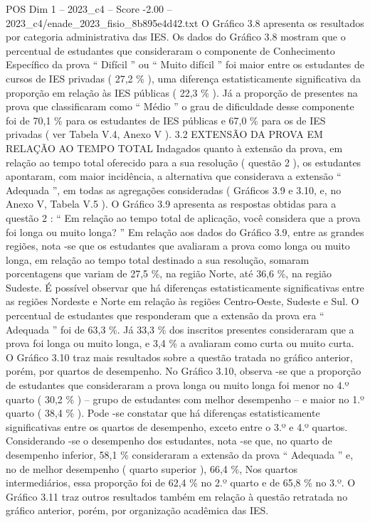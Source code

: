 \begin{textsample}{POS Dim 1 – 2023\_c4 – Score -2.00 – 2023\_c4/enade\_2023\_fisio\_8b895e4d42.txt}
O Gráfico 3.8 apresenta os resultados por categoria administrativa das IES.
Os dados do Gráfico 3.8 mostram que o percentual de estudantes que consideraram o componente de Conhecimento Específico da prova “ Difícil ” ou “ Muito difícil ” foi maior entre os estudantes de cursos de IES privadas ( 27,2 \% ), uma diferença estatisticamente significativa da proporção em relação às IES públicas ( 22,3 \% ).
Já a proporção de presentes na prova que classificaram como “ Médio ” o grau de dificuldade desse componente foi de 70,1 \% para os estudantes de IES públicas e 67,0 \% para os de IES privadas ( ver Tabela V.4, Anexo V ). 3.2 EXTENSÃO DA PROVA EM RELAÇÃO AO TEMPO TOTAL Indagados quanto à extensão da prova, em relação ao tempo total oferecido para a sua resolução ( questão 2 ), os estudantes apontaram, com maior incidência, a alternativa que considerava a extensão “ Adequada ”, em todas as agregações consideradas ( Gráficos 3.9 e 3.10, e, no Anexo V, Tabela V.5 ).
O Gráfico 3.9 apresenta as respostas obtidas para a questão 2 : “ Em relação ao tempo total de aplicação, você considera que a prova foi longa ou muito longa? ” Em relação aos dados do Gráfico 3.9, entre as grandes regiões, nota -se que os estudantes que avaliaram a prova como longa ou muito longa, em relação ao tempo total destinado a sua resolução, somaram porcentagens que variam de 27,5 \%, na região Norte, até 36,6 \%, na região Sudeste.
É possível observar que há diferenças estatisticamente significativas entre as regiões Nordeste e Norte em relação às regiões Centro-Oeste, Sudeste e Sul.
O percentual de estudantes que responderam que a extensão da prova era “ Adequada ” foi de 63,3 \%.
Já 33,3 \% dos inscritos presentes consideraram que a prova foi longa ou muito longa, e 3,4 \% a avaliaram como curta ou muito curta.
O Gráfico 3.10 traz mais resultados sobre a questão tratada no gráfico anterior, porém, por quartos de desempenho.
No Gráfico 3.10, observa -se que a proporção de estudantes que consideraram a prova longa ou muito longa foi menor no 4.º quarto ( 30,2 \% ) – grupo de estudantes com melhor desempenho – e maior no 1.º quarto ( 38,4 \% ).
Pode -se constatar que há diferenças estatisticamente significativas entre os quartos de desempenho, exceto entre o 3.º e 4.º quartos.
Considerando -se o desempenho dos estudantes, nota -se que, no quarto de desempenho inferior, 58,1 \% consideraram a extensão da prova “ Adequada ” e, no de melhor desempenho ( quarto superior ), 66,4 \%, Nos quartos intermediários, essa proporção foi de 62,4 \% no 2.º quarto e de 65,8 \% no 3.º.
O Gráfico 3.11 traz outros resultados também em relação à questão retratada no gráfico anterior, porém, por organização acadêmica das IES.

\end{textsample}
